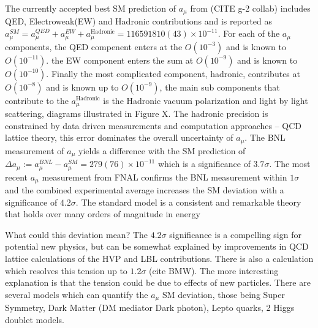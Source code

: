 The currently accepted best SM prediction of $a_\mu$ from (CITE g-2 collab) includes QED, Electroweak(EW) and Hadronic contributions and is reported as $a_\mu^{SM} = a_\mu^{QED}+ a_\mu^{EW}+a_\mu^{\text{Hadronic}} = 116 591 810(43) \times 10^{-11}$. For each of the $a_\mu$ components, the QED compenent enters at the $O(10^{-3})$ and is known to $O(10^{-11})$. the EW component enters the sum at $O(10^{-9})$ and is known to $O(10^{-10})$. Finally the most complicated component, hadronic, contributes at $O(10^{-8})$ and is known up to $O(10^{-9})$, the  main sub components that contribute to the $a_\mu^{\text{Hadronic}}$ is the Hadronic vacuum polarization and light by light scattering, diagrams illustrated in Figure X. The hadronic precision is constrained by data driven measurements and computation approaches -- QCD lattice theory, this error dominates the overall uncertainty of $a_\mu$. The BNL measurement of $a_\mu$ yields a difference with the SM prediction of $\Delta a_\mu := a_\mu^{BNL} - a_\mu^{SM} = 279(76) \times 10^{-11}$ which is a significance of $3.7\sigma$. The most recent $a_\mu$ measurement from FNAL confirms the BNL measurement within $1\sigma$ and the combined experimental average increases the SM deviation with a significance of $4.2\sigma$.
The standard model is a consistent and remarkable theory that holds over many orders of magnitude in energy

What could this deviation mean?
The $4.2\sigma$ significance is a compelling sign for potential new physics, but can be somewhat explained by improvements in QCD lattice calculations of the HVP and LBL contributions. There is also a calculation which resolves this tension up to $1.2\sigma$ (cite BMW). The more interesting explanation is that the tension could be due to effects of new particles. There are several models which can quantify the $a_\mu$ SM deviation, those being Super Symmetry, Dark Matter (DM mediator Dark photon), Lepto quarks, 2 Higgs doublet models.



